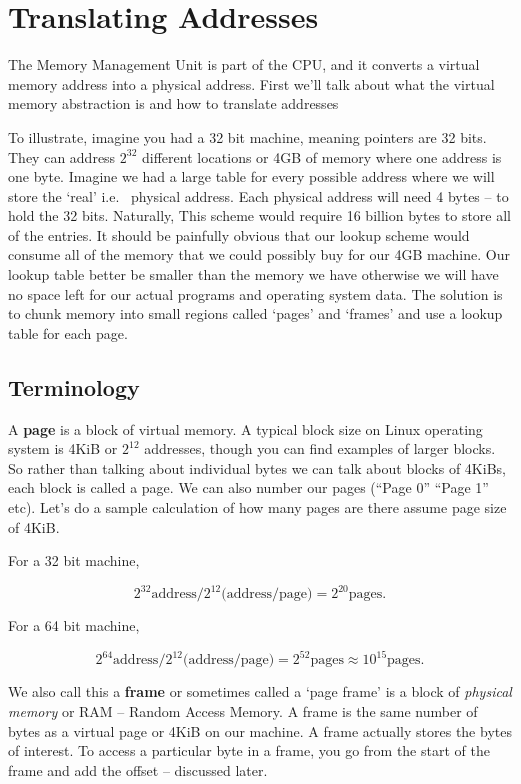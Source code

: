 \section{Translating Addresses}

The Memory Management Unit is part of the CPU, and it converts a virtual memory address into a physical address.
First we'll talk about what the virtual memory abstraction is and how to translate addresses

To illustrate, imagine you had a 32 bit machine, meaning pointers are 32 bits.
They can address $2^{32}$ different locations or 4GB of memory where one address is one byte.
Imagine we had a large table for every possible address where we will store the `real' i.e. ~physical address.
Each physical address will need 4 bytes -- to hold the 32 bits.
Naturally, This scheme would require 16 billion bytes to store all of the entries.
It should be painfully obvious that our lookup scheme would consume all of the memory that we could possibly buy for our 4GB machine.
Our lookup table better be smaller than the memory we have otherwise we will have no space left for our actual programs and operating system data.
The solution is to chunk memory into small regions called `pages' and `frames' and use a lookup table for each page.

\subsection{Terminology}

A \textbf{page} is a block of virtual memory.
A typical block size on Linux operating system is 4KiB or $2^{12}$ addresses, though you can find examples of larger blocks.
So rather than talking about individual bytes we can talk about blocks of 4KiBs, each block is called a page.
We can also number our pages (``Page 0'' ``Page 1'' etc). Let's do a sample calculation of how many pages are there assume page size of 4KiB.

For a 32 bit machine,

\[
   2^{32} \text{address} / 2^{12} \text{(address/page)} = 2^{20} \text{pages}.
\]

For a 64 bit machine,

\[
   2^{64} \text{address} / 2^{12} \text{(address/page)} = 2^{52} \text{pages} \approx 10^{15} \text{pages}.
\]

We also call this a \textbf{frame} or sometimes called a `page frame' is a block of \emph{physical memory} or RAM -- Random Access Memory.
A frame is the same number of bytes as a virtual page or 4KiB on our machine.
A frame actually stores the bytes of interest.
To access a particular byte in a frame, you go from the start of the frame and add the offset -- discussed later.


